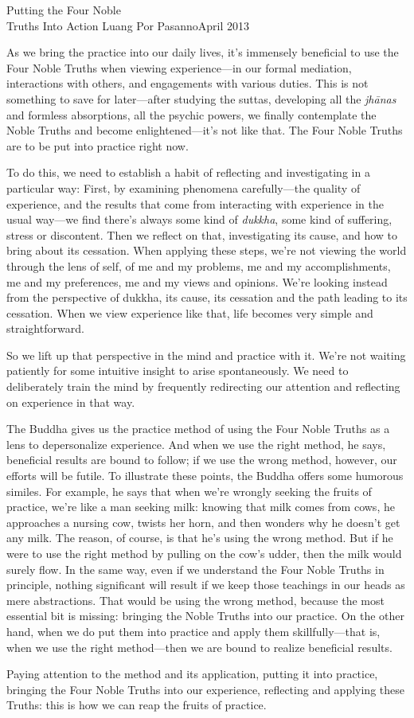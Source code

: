 {Putting the Four Noble\\Truths Into Action}
{Luang Por Pasanno}{April 2013}

As we bring the practice into our daily lives, it's immensely 
beneficial to use the Four Noble Truths when viewing experience---in 
our formal mediation, interactions with others, and engagements with 
various duties. This is not something to save for later---after 
studying the suttas, developing all the \emph{jhānas} and formless 
absorptions, all the psychic powers, we finally contemplate the Noble 
Truths and become enlightened---it's not like that. The Four Noble 
Truths are to be put into practice right now.

To do this, we need to establish a habit of reflecting and 
investigating in a particular way: First, by examining phenomena 
carefully---the quality of experience, and the results that come from 
interacting with experience in the usual way---we find there's always 
some kind of \emph{dukkha}, some kind of suffering, stress or 
discontent. Then we reflect on that, investigating its cause, and how 
to bring about its cessation. When applying these steps, we're not 
viewing the world through the lens of self, of me and my problems, me 
and my accomplishments, me and my preferences, me and my views and 
opinions. We're looking instead from the perspective of dukkha, its 
cause, its cessation and the path leading to its cessation. When we 
view experience like that, life becomes very simple and straightforward.

So we lift up that perspective in the mind and practice with it. We're 
not waiting patiently for some intuitive insight to arise 
spontaneously. We need to deliberately train the mind by frequently 
redirecting our attention and reflecting on experience in that way.

The Buddha gives us the practice method of using the Four Noble Truths 
as a lens to depersonalize experience. And when we use the right 
method, he says, beneficial results are bound to follow; if we use the 
wrong method, however, our efforts will be futile. To illustrate these 
points, the Buddha offers some humorous similes. For example, he says 
that when we're wrongly seeking the fruits of practice, we're like a 
man seeking milk: knowing that milk comes from cows, he approaches a 
nursing cow, twists her horn, and then wonders why he doesn't get any 
milk. The reason, of course, is that he's using the wrong method. But 
if he were to use the right method by pulling on the cow's udder, then 
the milk would surely flow. In the same way, even if we understand the 
Four Noble Truths in principle, nothing significant will result if we 
keep those teachings in our heads as mere abstractions. That would be 
using the wrong method, because the most essential bit is missing: 
bringing the Noble Truths into our practice. On the other hand, when we 
do put them into practice and apply them skillfully---that is, when we 
use the right method---then we are bound to realize beneficial results.

Paying attention to the method and its application, putting it into 
practice, bringing the Four Noble Truths into our experience, 
reflecting and applying these Truths: this is how we can reap the 
fruits of practice.

